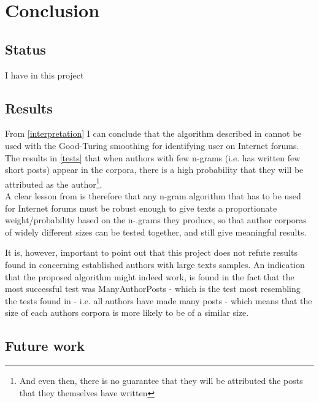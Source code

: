 \section{Conclusion}
\label{conclusion}

\subsection{Status}
I have in this project

\subsection{Results}
From \ref{interpretation} I can conclude that the algorithm described in \cite{nr4} cannot be used with the Good-Turing smoothing for identifying user on Internet forums. The results in \ref{tests} that when authors with few n-grams (i.e. has written few short posts) appear in the corpora, there is a high probability that they will be attributed as the author\footnote{And even then, there is no guarantee that they will be attributed the posts that they themselves have written}.\\

A clear lesson from \cite{nr4} is therefore that any n-gram algorithm that has to be used for Internet forums must be robust enough to give texts a proportionate weight/probability based on the n-.grams they produce, so that author corporas of widely different sizes can be tested together, and still give meaningful results. 

It is, however, important to point out that this project does not refute results found in \cite{nr4} concerning established authors with large texts samples. An indication that the proposed algorithm might indeed work, is found in the fact that the most successful test was ManyAuthorPosts - which is the test most resembling the tests found in \cite{nr4} - i.e. all authors have made many posts - which means that the size of each authors corpora is more likely to be of a similar size.\\

\subsection{Future work}

